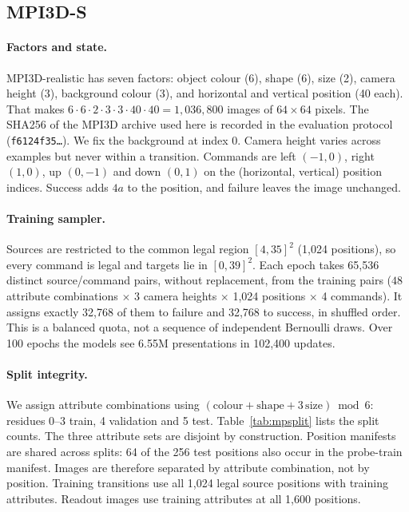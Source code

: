 \subsection{MPI3D-S}

\paragraph{Factors and state.} MPI3D-realistic has seven factors: object colour (6), shape (6), size (2), camera height (3), background colour (3), and horizontal and vertical position (40 each). That makes $6\cdot6\cdot2\cdot3\cdot3\cdot40\cdot40=1{,}036{,}800$ images of $64{\times}64$ pixels. The SHA256 of the MPI3D archive used here is recorded in the evaluation protocol (\texttt{f6124f35\ldots}). We fix the background at index 0. Camera height varies across examples but never within a transition. Commands are left $(-1,0)$, right $(1,0)$, up $(0,-1)$ and down $(0,1)$ on the (horizontal, vertical) position indices. Success adds $4a$ to the position, and failure leaves the image unchanged.

\paragraph{Training sampler.} Sources are restricted to the common legal region $[4,35]^2$ (1{,}024 positions), so every command is legal and targets lie in $[0,39]^2$. Each epoch takes 65{,}536 distinct source/command pairs, without replacement, from the \VMPTrainPairs{} training pairs ($48$ attribute combinations $\times$ 3 camera heights $\times$ 1{,}024 positions $\times$ 4 commands). It assigns exactly 32{,}768 of them to failure and 32{,}768 to success, in shuffled order. This is a balanced quota, not a sequence of independent Bernoulli draws. Over 100 epochs the models see 6.55M presentations in 102{,}400 updates.

\paragraph{Split integrity.} We assign attribute combinations using $(\mathrm{colour}+\mathrm{shape}+3\,\mathrm{size})\bmod6$: residues 0--3 train, 4 validation and 5 test. Table~\ref{tab:mpsplit} lists the split counts. The three attribute sets are disjoint by construction. Position manifests are shared across splits: 64 of the 256 test positions also occur in the probe-train manifest. Images are therefore separated by attribute combination, not by position. Training transitions use all 1{,}024 legal source positions with training attributes. Readout images use training attributes at all 1{,}600 positions.


